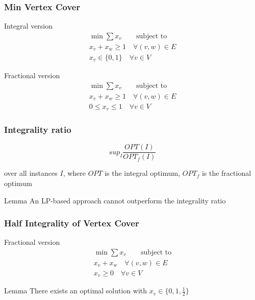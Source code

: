 \documentclass[12pt,aspectratio=169]{beamer}
\begin{document}
\begin{frame}\frametitle{Min Vertex Cover }
  \begin{block}{Integral version}
  \begin{equation}
    \begin{split}
      \min \sum x_{v} \qquad\text{subject to}\\
      x_{v} + x_{w} \ge 1\quad \forall (v,w)\in E\\
      x_{v}\in \{0,1\}\quad \forall v\in V
     \end{split}
   \end{equation}
 \end{block}
 \begin{block}{Fractional version}
  \begin{equation}
    \begin{split}
      \min \sum x_{v} \qquad\text{subject to}\\
      x_{v} + x_{w} \ge 1\quad \forall (v,w)\in E\\
      0\le x_{v}\le 1\quad \forall v\in V
     \end{split}
   \end{equation}
 \end{block}
\end{frame}


\begin{frame}\frametitle{Integrality ratio }
  \begin{equation}
    sup_{I} \frac{OPT(I)}{OPT_{f}(I)}
  \end{equation}

  over all instances $I$,
  where $OPT$ is the integral optimum, $OPT_{f}$ is the fractional optimum

  \begin{block}{Lemma}
    An LP-based approach cannot outperform the integrality ratio
  \end{block}
\end{frame}

\begin{frame}\frametitle{Half Integrality of Vertex Cover }
  \begin{block}{Fractional version}
  \begin{equation}
    \begin{split}
      \min \sum x_{v} \qquad\text{subject to}\\
      x_{v} + x_{w}\quad \forall (v,w)\in E\\
      x_{v}\ge 0 \quad \forall v\in V
     \end{split}
   \end{equation}
 \end{block}
 \begin{block}{Lemma}
     There exists an optimal solution with $x_{v}\in \{0, 1, \frac{1}{2}\}$
 \end{block}
\end{frame}
\end{document}
